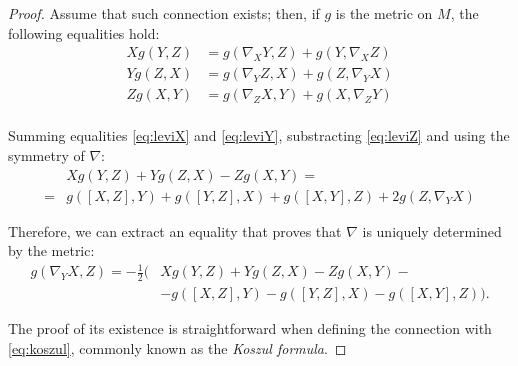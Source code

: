 \begin{proof}
	Assume that such  connection exists; then, if $g$ is the metric on $M$, the following equalities hold:
	\begin{align}
		\label{eq:leviX}
		X g(Y,Z) &= g(\nabla_X Y, Z) + g(Y, \nabla_X Z) \\
		\label{eq:leviY}
		Y g(Z,X) &= g(\nabla_Y Z, X) + g(Z, \nabla_Y X) \\
		\label{eq:leviZ}
		Z g(X,Y) &= g(\nabla_Z X, Y) + g(X, \nabla_Z Y) \\
	\end{align}

	Summing equalities \ref{eq:leviX} and \ref{eq:leviY}, substracting \ref{eq:leviZ} and using the symmetry of $\nabla$:
	\begin{align*}
		&X g(Y,Z) + Y g(Z,X) - Z g(X,Y) = \\
		= &g([X,Z], Y) + g([Y,Z], X) + g([X,Y], Z) + 2g(Z, \nabla_Y X)
	\end{align*}

	Therefore, we can extract an equality that proves that $\nabla$ is uniquely determined by the metric:
	\begin{align}
		\label{eq:koszul}
		g(\nabla_Y X, Z) = -\frac{1}{2} \big(&X g(Y,Z) + Y g(Z,X) - Zg(X,Y) - \\
		\nonumber
		&- g([X,Z], Y) - g([Y,Z], X) - g([X,Y],Z) \big).
	\end{align}

	The proof of its existence is straightforward when defining the connection with \autoref{eq:koszul}, commonly known as the \emph{Koszul formula}.
\end{proof}


